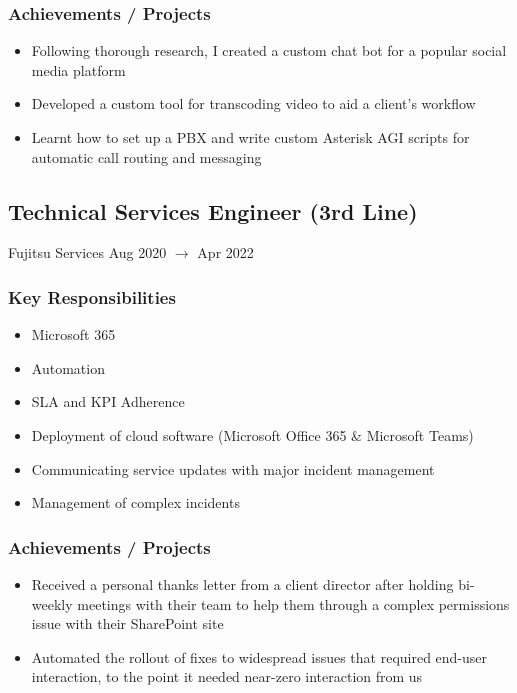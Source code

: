 \documentclass{report}
\begin{document}
		\subsubsection*{Achievements / Projects}
			\begin{itemize}
				\setlength\itemsep{0pt}
				\item Following thorough research, I created a custom chat bot for a popular social media platform
				\item Developed a custom tool for transcoding video to aid a client's workflow
				\item Learnt how to set up a PBX and write custom Asterisk AGI scripts for automatic call routing and messaging
			\end{itemize}

	\newpage
	
	\subsection*{\faServer \nobreakspace Technical Services Engineer (3rd Line)}
		Fujitsu Services \hfill Aug 2020 $\rightarrow$ Apr 2022

%
		\subsubsection*{Key Responsibilities}
			\begin{itemize}
				\setlength\itemsep{0pt}
				\item Microsoft 365
				\item Automation
				\item SLA and KPI Adherence
				\item Deployment of cloud software (Microsoft Office 365 \& Microsoft Teams)
				\item Communicating service updates with major incident management
				\item Management of complex incidents
			\end{itemize}

		\subsubsection*{Achievements / Projects}
			\begin{itemize}
				\setlength\itemsep{0pt}
				\item Received a personal thanks letter from a client director after holding bi-weekly meetings with their team to help them through a complex permissions issue with their SharePoint site
				\item Automated the rollout of fixes to widespread issues that required end-user interaction, to the point it needed near-zero interaction from us
			\end{itemize}
\end{document}
